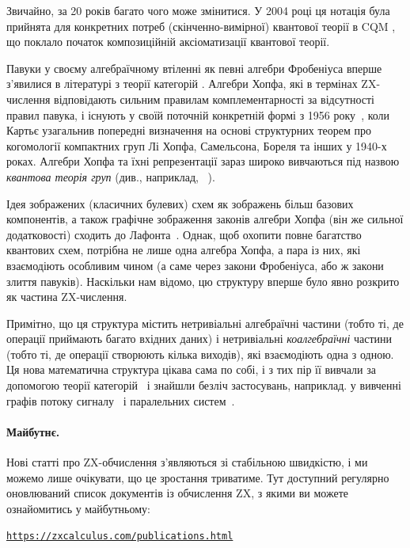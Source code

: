 \documentclass[11pt]{article}
\theoremstyle{definition}
\begin{document}
{Звичайно, за 20 років багато чого може змінитися. У 2004 році ця нотація була прийнята для конкретних потреб (скінченно-вимірної) квантової теорії в CQM \cite{AC1}, що поклало початок композиційній аксіоматизації квантової теорії.

Павуки у своєму алгебраїчному втіленні як певні алгебри Фробеніуса вперше з’явилися в літературі з теорії категорій \cite{CarboniWalters, Lack}. Алгебри Хопфа, які в термінах ZX-числення відповідають сильним правилам комплементарності за відсутності правил павука, і існують у своїй поточній конкретній формі з 1956 року~\cite{cartier2007primer}, коли Картьє узагальнив попередні визначення на основі структурних теорем про когомології компактних груп Лі Хопфа, Самельсона, Бореля та інших у 1940-х роках.
Алгебри Хопфа та їхні репрезентації зараз широко вивчаються під назвою \textit{квантова теорія груп} (див., наприклад, ~\cite{majid2000foundations}).

Ідея зображених (класичних булевих) схем як зображень більш базових компонентів, а також графічне зображення законів алгебри Хопфа (він же сильної додатковості) сходить до Лафонта~\cite{Lafont}. Однак, щоб охопити повне багатство квантових схем, потрібна не лише одна алгебра Хопфа, а пара із них, які взаємодіють особливим чином (а саме через закони Фробеніуса, або ж закони злиття павуків). Наскільки нам відомо, цю структуру вперше було явно розкрито як частина ZX-числення.

Примітно, що ця структура містить нетривіальні алгебраїчні частини (тобто ті, де операції приймають багато вхідних даних) і нетривіальні \textit{коалгебраїчні} частини (тобто ті, де операції створюють кілька виходів), які взаємодіють одна з одною. Ця нова математична структура цікава сама по собі, і з тих пір її вивчали за допомогою теорії категорій~\cite{PawelRel,RossKevin,bonchi2017interacting,bonchi2019graphical} і знайшли безліч застосувань, наприклад. у вивченні графів потоку сигналу~\cite{signalflownew} і паралельних систем~\cite{bonchi2019concurrent}.

\paragraph{Майбутнє.}  Нові статті про ZX-обчислення з’являються зі стабільною швидкістю, і ми можемо лише очікувати, що це зростання триватиме. Тут доступний регулярно оновлюваний список документів із обчислення ZX, з якими ви можете ознайомитись у майбутньому:
\begin{center}
  \href{https://zxcalculus.com/publications.html}{\tt https://zxcalculus.com/publications.html}
\end{center}

}
\end{document}
